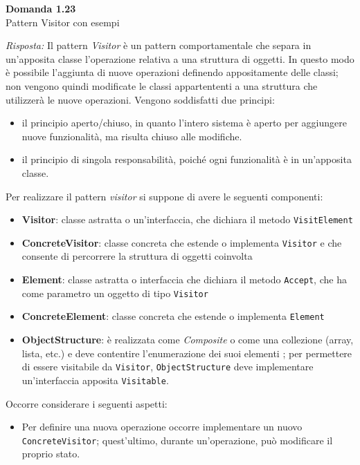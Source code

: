 \documentclass{article}
\newenvironment{problem}[2][Domanda]
    { \begin{mdframed}[backgroundcolor=gray!20] \textbf{#1 #2} \\}
    {  \end{mdframed}}
\newenvironment{solution}
    {\textit{Risposta:}}
    {}
\begin{document}
\begin{problem}{1.23}
Pattern Visitor con esempi
\end{problem}
\begin{solution}
Il pattern \textit{Visitor} è un pattern comportamentale che separa in un'apposita classe l'operazione relativa a una struttura di oggetti.
\newline
In questo modo è possibile l'aggiunta di nuove operazioni definendo appositamente delle classi; non vengono quindi modificate le classi appartententi a una struttura che utilizzerà le nuove operazioni.
Vengono soddisfatti due principi:


\begin{itemize}
\item il principio aperto/chiuso, in quanto l'intero sistema è aperto per aggiungere nuove funzionalità, ma risulta chiuso alle modifiche.
\item il principio di singola responsabilità, poiché ogni funzionalità è in un'apposita classe.
\end{itemize}
Per realizzare il pattern \textit{visitor} si suppone di avere le seguenti componenti:
\begin{itemize}
	\item \textbf{Visitor}: classe astratta o un'interfaccia, che dichiara il metodo \texttt{VisitElement}
	\item \textbf{ConcreteVisitor}: classe concreta che estende o implementa \texttt{Visitor} e che consente di percorrere la struttura di oggetti coinvolta
	\item \textbf{Element}: classe astratta o interfaccia che dichiara il metodo \texttt{Accept}, che ha come parametro un oggetto di tipo \texttt{Visitor}
	\item \textbf{ConcreteElement}: classe concreta che estende o implementa \texttt{Element}
	\item \textbf{ObjectStructure}: è realizzata come \textit{Composite} o come una collezione (array, lista, etc.) e deve contentire l'enumerazione dei suoi elementi ; per permettere di essere visitabile da \texttt{Visitor}, \texttt{ObjectStructure} deve implementare un'interfaccia apposita \texttt{Visitable}.
\end{itemize}
Occorre considerare i seguenti aspetti:
\begin{itemize}
	\item Per definire una nuova operazione occorre implementare un nuovo \texttt{ConcreteVisitor}; quest'ultimo, durante un'operazione, può modificare il proprio stato.

\end{itemize}
\end{solution}
\end{document}
